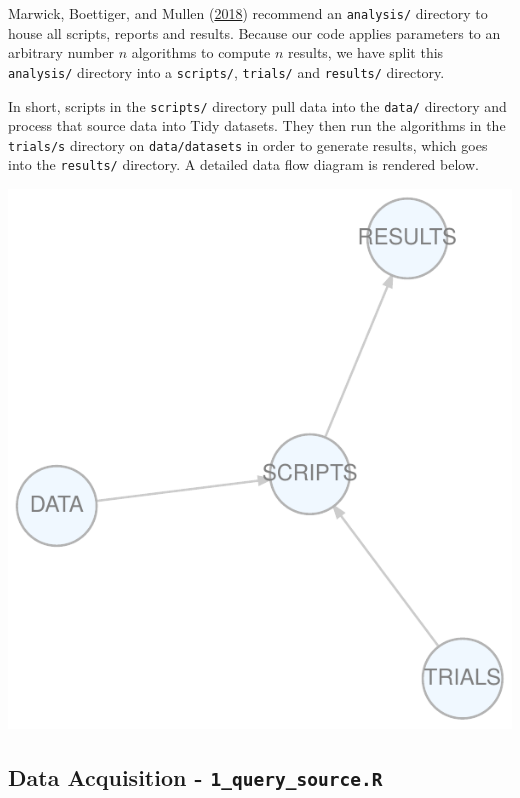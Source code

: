 \documentclass[11pt,preprint, authoryear]{elsarticle}
\let\origfigure\figure
\let\endorigfigure\endfigure
\renewenvironment{figure}[1][2] {
    \expandafter\origfigure\expandafter[H]
} {
    \endorigfigure
}
\numberwithin{equation}{section}
\numberwithin{figure}{section}
\numberwithin{table}{section}
\begin{document}
Marwick, Boettiger, and Mullen
(\protect\hyperlink{ref-Marwick2018}{2018}) recommend an
\texttt{analysis/} directory to house all scripts, reports and results.
Because our code applies parameters to an arbitrary number \(n\)
algorithms to compute \(n\) results, we have split this
\texttt{analysis/} directory into a \texttt{scripts/}, \texttt{trials/}
and \texttt{results/} directory.

In short, scripts in the \texttt{scripts/} directory pull data into the
\texttt{data/} directory and process that source data into Tidy
datasets. They then run the algorithms in the \texttt{trials/s}
directory on \texttt{data/datasets} in order to generate results, which
goes into the \texttt{results/} directory. A detailed data flow diagram
is rendered below.

\begin{figure}
\centering
\includegraphics{data/coarse_workflow.pdf}
\caption{Coarse Analytical Workflow\label{Coarse Flow}}
\end{figure}

\newpage

\subsection{\texorpdfstring{Data Acquisition -
\texttt{1\_query\_source.R}}{Data Acquisition - 1\_query\_source.R}}\label{data-acquisition---1_query_source.r}
\end{document}
